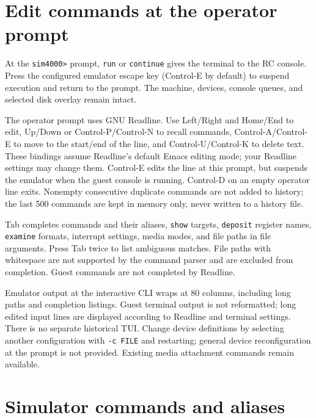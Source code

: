 \section{Edit commands at the operator prompt}\label{edit-commands-at-the-operator-prompt}

At the \passthrough{\lstinline!sim4000>!} prompt, \passthrough{\lstinline!run!} or \passthrough{\lstinline!continue!} gives the terminal to the RC console. Press the configured emulator escape key (Control-E by default) to suspend execution and return to the prompt. The machine, devices, console queues, and selected disk overlay remain intact.

The operator prompt uses GNU Readline. Use Left/Right and Home/End to edit, Up/Down or Control-P/Control-N to recall commands, Control-A/Control-E to move to the start/end of the line, and Control-U/Control-K to delete text. These bindings assume Readline's default Emacs editing mode; your Readline settings may change them. Control-E edits the line at this prompt, but suspends the emulator when the guest console is running. Control-D on an empty operator line exits. Nonempty consecutive duplicate commands are not added to history; the last 500 commands are kept in memory only, never written to a history file.

Tab completes commands and their aliases, \passthrough{\lstinline!show!} targets, \passthrough{\lstinline!deposit!} register names, \passthrough{\lstinline!examine!} formats, interrupt settings, media modes, and file paths in file arguments. Press Tab twice to list ambiguous matches. File paths with whitespace are not supported by the command parser and are excluded from completion. Guest commands are not completed by Readline.

Emulator output at the interactive CLI wraps at 80 columns, including long paths and completion listings. Guest terminal output is not reformatted; long edited input lines are displayed according to Readline and terminal settings. There is no separate historical TUI. Change device definitions by selecting another configuration with \passthrough{\lstinline!-c FILE!} and restarting; general device reconfiguration at the prompt is not provided. Existing media attachment commands remain available.

\section{Simulator commands and aliases}\label{simulator-commands-and-aliases}

